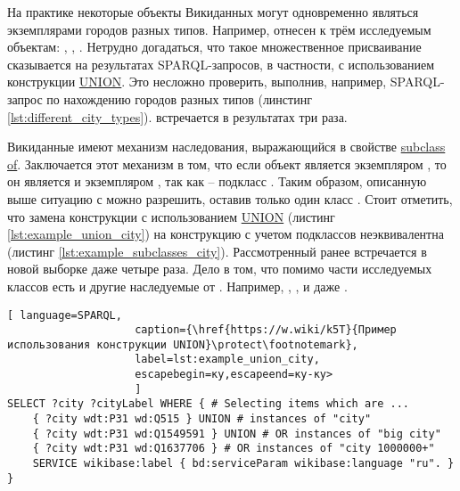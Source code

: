 На практике некоторые объекты Викиданных могут одновременно являться экземплярами городов разных типов. Например,  отнесен к трём исследуемым объектам: , , . Нетрудно догадаться, что такое множественное присваивание сказывается на результатах SPARQL-запросов, в частности, с использованием конструкции \href{https://en.wikibooks.org/wiki/SPARQL/UNION}{UNION}. Это несложно проверить, выполнив, например, SPARQL-запрос по нахождению городов разных типов (линстинг \ref{lst:different_city_types}).  встречается в результатах три раза. 

Викиданные имеют механизм наследования, выражающийся в свойстве \href{https://www.wikidata.org/wiki/Property:P279}{subclass of}. Заключается этот механизм в том, что если объект является экземпляром , то он является и экземпляром  , так как  -- подкласс  . Таким образом, описанную выше ситуацию с  можно разрешить, оставив только один класс . Стоит отметить, что замена конструкции с использованием \href{https://en.wikibooks.org/wiki/SPARQL/UNION}{UNION} (листинг \ref{lst:example_union_city}) на конструкцию с учетом подклассов неэквивалентна (листинг \ref{lst:example_subclasses_city}). Рассмотренный ранее  встречается в новой выборке даже четыре раза. Дело в том, что помимо части исследуемых классов есть и другие наследуемые от . Например, , ,  и даже .

\begin{lstlisting}[ language=SPARQL, 
                    caption={\href{https://w.wiki/k5T}{Пример использования конструкции UNION}\protect\footnotemark},
                    label=lst:example_union_city, 
                    escapebegin=ку,escapeend=ку-ку>
                    ]
SELECT ?city ?cityLabel WHERE { # Selecting items which are ...
	{ ?city wdt:P31 wd:Q515 } UNION # instances of "city"            
	{ ?city wdt:P31 wd:Q1549591 } UNION # OR instances of "big city"               
	{ ?city wdt:P31 wd:Q1637706 } # OR instances of "city 1000000+"
	SERVICE wikibase:label { bd:serviceParam wikibase:language "ru". }
}
\end{lstlisting}

